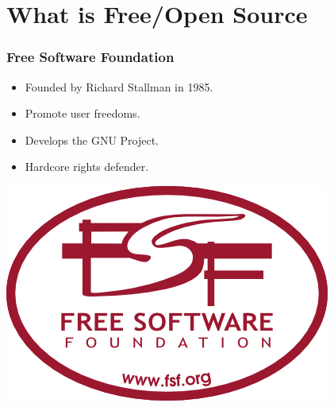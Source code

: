 \documentclass[hyperref={pdfpagelabels=false},xcolor=pst,pdf,fragile]{beamer}
\title{\Title}
\author{\Author\\ \Matricula}
\date{\today}
\begin{document}
\maketitle



\section{What is Free/Open Source}

\begin{frame}
  \frametitle{Free Software Foundation}

  \begin{itemize}
	\item Founded by Richard Stallman in 1985.
	\item Promote user freedoms.
	\item Develops the GNU Project.
	\item Hardcore rights defender.
  \end{itemize}

  \begin{center}
	  \includegraphics[scale=0.4]{img/fsf.png}
  \end{center}

\end{frame}
\end{document}
